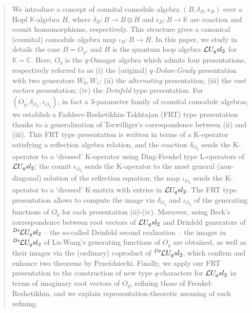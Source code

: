 \documentclass[11pt]{amsart}
\numberwithin{equation}{section}
\numberwithin{equation}{section}
\begin{document}
	\begin{abstract} 
	 We introduce a concept of counital comodule algebra $(B,\delta_B,\epsilon_B)$ over a Hopf ${\mathbb K}$-algebra $H$, where $\delta_B\colon B\rightarrow B \otimes H$ and $\epsilon_B\colon B\rightarrow {\mathbb K}$ are coaction and counit homomorphisms, respectively. This structure gives a canonical (counital) comodule algebra map $\iota_B\colon B \rightarrow H$. In this paper, we study in details the case $B=O_q$, and $H$ is the quantum loop algebra $\Loop$ for ${\mathbb K}={\mathbb C}$. Here, $O_q$ is the $q$-Onsager algebra which admits four presentations, respectively referred to as (i) the (original) {\it $q$-Dolan-Grady} presentation with two generators $W_0,W_1$; (ii) the {\it alternating} presentation;	(iii) the {\it root vectors} presentation;	(iv) the {\it Drinfeld} type presentation.	For $(O_q,\delta_{O_q},\epsilon_{O_q})$, in fact a 3-parameter family of counital comodule algebras, we establish a Faddeev-Reshetikhin-Takhtajan (FRT)  type presentation thanks to a generalization of  Terwilliger's correspondence between (ii) and (iii). This FRT type presentation is written in terms of a K-operator satisfying a reflection algebra relation, and the coaction $\delta_{O_q}$ sends the K-operator to a `dressed' K-operator using Ding-Frenkel type L-operators of $\Loop$; the counit $\epsilon_{O_q}$ sends the K-operator to the most general (non-diagonal) solution of the reflection equation; the map $\iota_{O_q}$ sends the K-operator to a `dressed' K-matrix with entries in $\Loop$. The FRT type presentation allows to compute the image via $\delta_{O_q}$ and $\iota_{O_q}$ of the generating functions of $O_q$ for each presentation  (ii)-(iv). Moreover, using Beck's correspondence between root vectors of $\Loop$ and Drinfeld generators of ${}^{Dr}\!\Loop$ -- the so-called Drinfeld second realization --   the images in ${}^{Dr}\!\Loop$  of Lu-Wang's generating functions of $O_q$ are obtained,  as well as their images via the (ordinary) coproduct of ${}^{Dr}\!\Loop$, which confirm and enhance two theorems by Prze\'zdziecki.  Finally, we apply our FRT presentation to the construction of new type $q$-characters for $\Loop$ in terms of imaginary root vectors of $O_q$, refining those of Frenkel-Reshetikhin, and we explain representation-theoretic meaning of such refining.
    \end{abstract}

	\maketitle
	
\end{document}
